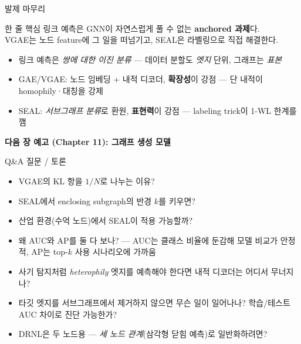 \begin{frame}{발제 마무리}
\begin{block}{한 줄 핵심}
링크 예측은 GNN이 자연스럽게 풀 수 없는 \textbf{anchored 과제}다.\\
VGAE는 노드 feature에 그 일을 떠넘기고, SEAL은 라벨링으로 직접 해결한다.
\end{block}
\vspace{0.4em}
\begin{itemize}
  \item 링크 예측은 \emph{쌍에 대한 이진 분류} — 데이터 분할도 \emph{엣지} 단위, 그래프는 \emph{표본}
  \item GAE/VGAE: 노드 임베딩 + 내적 디코더, \textbf{확장성}이 강점 — 단 내적이 homophily·대칭을 강제
  \item SEAL: \emph{서브그래프 분류}로 환원, \textbf{표현력}이 강점 — labeling trick이 1-WL 한계를 깸
\end{itemize}
\vspace{0.5em}
\textbf{다음 장 예고 (Chapter 11): 그래프 생성 모델}
\end{frame}

\begin{frame}{Q\&A}
\centering
\Large 질문 / 토론
\vspace{1em}

\small
\begin{itemize}
  \item VGAE의 KL 항을 $1/N$로 나누는 이유?
  \item SEAL에서 enclosing subgraph의 반경 $k$를 키우면?
  \item 산업 환경(수억 노드)에서 SEAL이 적용 가능할까?
  \item 왜 AUC와 AP를 둘 다 보나? — AUC는 클래스 비율에 둔감해 모델 비교가 안정적, AP는 top-$k$ 사용 시나리오에 가까움
  \item 사기 탐지처럼 \emph{heterophily} 엣지를 예측해야 한다면 내적 디코더는 어디서 무너지나?
  \item 타깃 엣지를 서브그래프에서 제거하지 않으면 무슨 일이 일어나나? 학습/테스트 AUC 차이로 진단 가능한가?
  \item DRNL은 두 노드용 — \emph{세 노드 관계}(삼각형 닫힘 예측)로 일반화하려면?
\end{itemize}
\end{frame}
